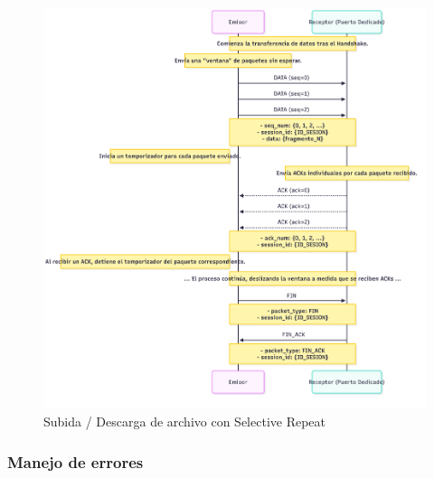 \begin{figure}[H]
    \centering
    \includegraphics[width=1\linewidth]{images/UPLOAD_DOWNLOAD_SR}
    \caption{Subida / Descarga de archivo con Selective Repeat}
    \label{fig:placeholder}
\end{figure}

\subsubsection{Manejo de errores}


